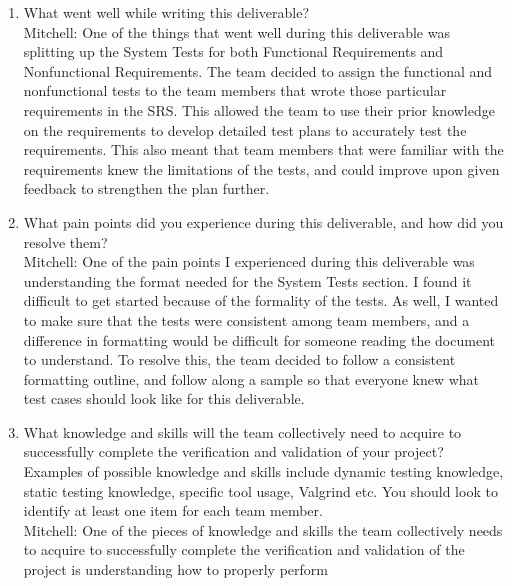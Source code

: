 \documentclass[12pt, titlepage]{article}
\begin{document}
\begin{enumerate}
  \item What went well while writing this deliverable?\\
  \newline
  \hspace{2em} Mitchell: One of the things that went well during this deliverable was splitting up
  the System Tests for both Functional Requirements and Nonfunctional Requirements. The team decided
  to assign the functional and nonfunctional tests to the team members that wrote those particular
  requirements in the SRS. This allowed the team to use their prior knowledge on the requirements
  to develop detailed test plans to accurately test the requirements. This also meant that team members
  that were familiar with the requirements knew the limitations of the tests, and could improve upon
  given feedback to strengthen the plan further.\\
  \item What pain points did you experience during this deliverable, and how
    did you resolve them?\\
  \newline
  \hspace{2em} Mitchell: One of the pain points I experienced during this deliverable was understanding the
  format needed for the System Tests section. I found it difficult to get started because of the formality
  of the tests. As well, I wanted to make sure that the tests were consistent among team members, and a difference
  in formatting would be difficult for someone reading the document to understand. To resolve this, the team decided
  to follow a consistent formatting outline, and follow along a sample so that everyone knew what test cases
  should look like for this deliverable.\\
  \item What knowledge and skills will the team collectively need to acquire to
  successfully complete the verification and validation of your project?
  Examples of possible knowledge and skills include dynamic testing knowledge,
  static testing knowledge, specific tool usage, Valgrind etc.  You should look to
  identify at least one item for each team member.\\
  \newline
  \hspace{2em} Mitchell: One of the pieces of knowledge and skills the team collectively needs to acquire to 
  successfully complete the verification and validation of the project is understanding how to properly perform

\end{enumerate}
\end{document}
